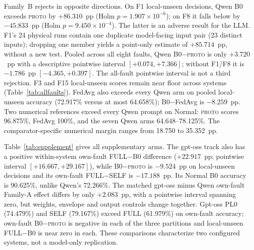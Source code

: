 \documentclass[conference]{IEEEtran}
\newcommand{\PROTO}{\textsc{proto}}
\newcommand{\cond}[1]{\textsf{#1}}
\begin{document}
\begin{table}[t]
\centering\footnotesize
\caption{Follow-up fixed-denominator accuracy by fault for every Qwen arm and both numerical references. Each own-fault value has 24 physical runs; each local-unseen value has the same 24 runs evaluated for seven receivers. These are descriptive rates, not additional fault-level tests.}
\label{tab:allfaults}
\setlength{\tabcolsep}{6.5pt}

\end{table}

Family~B rejects in opposite directions. On F1 local-unseen decisions, Qwen \cond{B0} exceeds \PROTO{} by $+86.310$~pp (Holm $p=1.907\times10^{-6}$); on F8 it falls below by $-45.833$~pp (Holm $p=9.450\times10^{-4}$). The latter is an adverse result for the LLM. F1's 24 physical runs contain one duplicate model-facing input pair (23 distinct inputs); dropping one member yields a point-only estimate of $+85.714$~pp, without a new test. Pooled across all eight faults, Qwen \cond{B0}$-$\PROTO{} is only $+3.720$~pp with a descriptive pointwise interval $[+0.074,+7.366]$; without F1/F8 it is $-1.786$~pp $[-4.365,+0.397]$. The all-fault pointwise interval is not a third rejection. F3 and F15 local-unseen scores remain near floor across systems (Table~\ref{tab:allfaults}). FedAvg also exceeds every Qwen arm on pooled local-unseen accuracy (72.917\% versus at most 64.658\%); \cond{B0}$-$FedAvg is $-8.259$~pp. Two numerical references exceed every Qwen prompt on Normal: \PROTO{} scores 96.875\%, FedAvg 100\%, and the seven Qwen arms 64.648--78.125\%. The comparator-specific numerical margin ranges from 18.750 to 35.352~pp.

Table~\ref{tab:supplement} gives all supplementary arms. The gpt-oss track also has a positive within-system own-fault \cond{FULL}$-$\cond{B0} difference ($+22.917$~pp; pointwise interval $[+16.667,+29.167]$), while \cond{B0}$-$\PROTO{} is $-9.524$~pp on local-unseen decisions and its own-fault \cond{FULL}$-$\cond{SELF} is $-17.188$~pp. Its Normal \cond{B0} accuracy is 90.625\%, unlike Qwen's 72.266\%. The matched gpt-oss minus Qwen own-fault Family-A effect differs by only $+2.083$~pp, with a pointwise interval spanning zero, but weights, envelope and output controls change together. Gpt-oss \cond{PL0} (74.479\%) and \cond{SELF} (79.167\%) exceed \cond{FULL} (61.979\%) on own-fault accuracy; own-fault \cond{B0}$-$\PROTO{} is negative in each of the three partitions and local-unseen \cond{FULL}$-$\cond{B0} is near zero in each. These comparisons characterize two configured systems, not a model-only replication.
\end{document}
